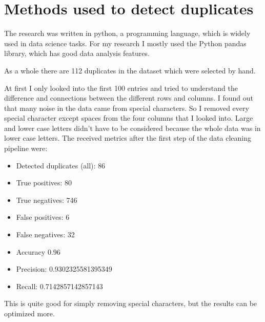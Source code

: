 \documentclass[conference]{IEEEtran}
\begin{document}
\section{Methods used to detect duplicates} \label{sec_methods}
The research was written in python, a programming language, which is widely used in data science tasks. For my research I mostly used the Python pandas library, which has good data analysis features. 

As a whole there are 112 duplicates in the dataset which were selected by hand.

At first I only looked into the first 100 entries and tried to understand the difference and connections between the different rows and columns. I found out that many noise in the data came from special characters. So I removed every special character except spaces from the four columns that I looked into. Large and lower case letters didn't have to be considered because the whole data was in lower case letters. The received metrics after the first step of the data cleaning pipeline were: 
\begin{itemize}
	\item Detected duplicates (all): 86
	\item True positives: 80
	\item True negatives: 746
    \item False positives: 6
	\item False negatives: 32
	\item Accuracy 0.96
    \item Precision: 0.9302325581395349
	\item Recall: 0.7142857142857143
\end{itemize}
This is quite good for simply removing special characters, but the results can be optimized more. 
\end{document}
